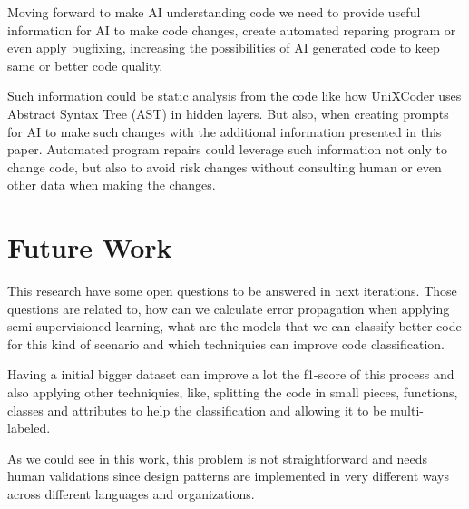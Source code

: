 \documentclass[conference]{IEEEtran}
\begin{document}
Moving forward to make AI understanding code we need to provide useful information for AI to make code changes, create automated reparing program or even apply bugfixing, increasing the possibilities of AI generated code to keep same or better code quality.

Such information could be static analysis from the code like how UniXCoder uses Abstract Syntax Tree (AST) \cite{ZHENG2023107194} in hidden layers. But also, when creating prompts for AI to make such changes with the additional information presented in this paper. 
Automated program repairs could leverage such information not only to change code, but also to avoid risk changes without consulting human or even other data when making the changes. 



\section{Future Work}

This research have some open questions to be answered in next iterations. 
Those questions are related to, how can we calculate error propagation when applying semi-supervisioned learning, what are the models that we can classify better code for this kind of scenario and which techniquies can improve code classification.

Having a initial bigger dataset can improve a lot the f1-score of this process and also applying other techniquies, like, splitting the code in small pieces, functions, classes and attributes to help the classification and allowing it to be multi-labeled.

As we could see in this work, this problem is not straightforward and needs human validations since design patterns are implemented in very different ways across different languages and organizations.



\end{document}
